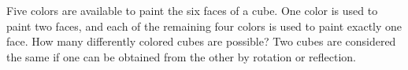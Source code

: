 Five colors are available to paint the six faces of a cube. One color is used to paint two faces, and each of the remaining four colors is used to paint exactly one face. How many differently colored cubes are possible? Two cubes are considered the same if one can be obtained from the other by rotation or reflection.
